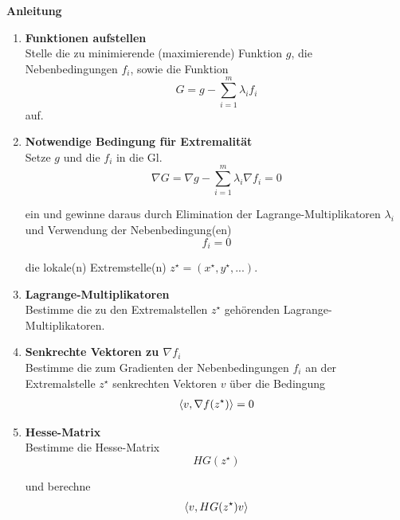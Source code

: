 \documentclass{article}
\begin{document}
\textbf{Anleitung}
	\begin{enumerate}
		\item \textbf{Funktionen aufstellen}\\
		Stelle die zu minimierende (maximierende) Funktion $g$, die Nebenbedingungen $f_i$, sowie die Funktion
			\begin{equation}
				G = g - \sum_{i=1}^m \lambda_i f_i
			\end{equation}
		auf.


		\item \textbf{Notwendige Bedingung für Extremalität}\\
		Setze $g$ und die $f_i$ in die Gl.
			\begin{equation}
				\nabla G = \nabla g - \sum_{i=1}^m \lambda_i \nabla f_i = 0
			\end{equation}

		 ein und gewinne daraus durch Elimination der Lagrange-Multiplikatoren $\lambda_i$ und Verwendung der Nebenbedingung(en)
		 	\begin{equation}
				 f_i = 0
		 	\end{equation}

		die lokale(n) Extremstelle(n) $z^\star = (x^\star,y^\star,...)$.


		\item \textbf{Lagrange-Multiplikatoren}\\
		Bestimme die zu den Extremalstellen $z^\star$ gehörenden Lagrange-Multiplikatoren.


		\item \textbf{Senkrechte Vektoren zu $\nabla f_i$}\\
		Bestimme die zum Gradienten der Nebenbedingungen $f_i$ an der Extremalstelle $z^\star$ senkrechten Vektoren $v$ über die Bedingung
			\begin{align*}
				\braket{v,\nabla f(z^\star)} = 0
			\end{align*}	


		\item \textbf{Hesse-Matrix}\\
		Bestimme die Hesse-Matrix
			\begin{equation}
				HG(z^\star)
			\end{equation}
		
		und berechne
			\begin{equation}
				\braket{v,HG(z^\star) v}
			\end{equation}
	\end{enumerate}
\end{document}
